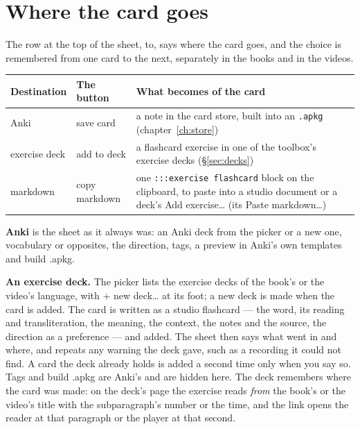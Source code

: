 \documentclass[11pt,oneside]{report}
\newcommand{\file}[1]{\texttt{#1}}
\newcommand{\menu}[1]{\textsf{#1}}
\begin{document}
\section{Where the card goes}
\label{sec:cardto}

The row at the top of the sheet, \menu{to}, says where the card goes, and
the choice is remembered from one card to the next, separately in the books
and in the videos.

\begin{center}
\begin{tabular}{@{}lp{}p{}@{}}
\toprule
\textsf{Destination} & \textsf{The button} & \textsf{What becomes of the card} \\
\midrule
\menu{Anki} & \menu{save card} & a note in the card store, built into an
  \file{.apkg} (chapter~\ref{ch:store}) \\
\addlinespace
\menu{exercise deck} & \menu{add to deck} & a flashcard exercise in one of
  the toolbox's exercise decks (\S\ref{sec:decks}) \\
\addlinespace
\menu{markdown} & \menu{copy markdown} & one \texttt{:::exercise flashcard}
  block on the clipboard, to paste into a studio document or a deck's
  \menu{Add exercise\ldots} (its \menu{Paste markdown\ldots}) \\
\bottomrule
\end{tabular}
\end{center}

\textbf{Anki} is the sheet as it always was: an Anki deck from the picker or
a new one, vocabulary or opposites, the direction, tags, a preview in Anki's
own templates and \menu{build .apkg}.

\textbf{An exercise deck.} The picker lists the exercise decks of the book's
or the video's language, with \menu{+ new deck\ldots} at its foot; a new
deck is made when the card is added. The card is written as a studio
flashcard --- the word, its reading and transliteration, the meaning, the
context, the notes and the source, the direction as a preference --- and
added. The sheet then says what went in and where, and repeats any warning
the deck gave, such as a recording it could not find. A card the deck
already holds is added a second time only when you say so. Tags and
\menu{build .apkg} are Anki's and are hidden here. The deck remembers where
the card was made: on the deck's page the exercise reads \emph{from} the
book's or the video's title with the subparagraph's number or the time,
and the link opens the reader at that paragraph or the player at that
second.
\end{document}
